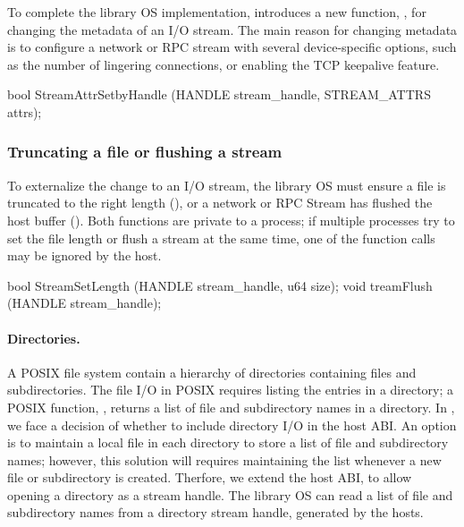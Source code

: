 To complete the library OS implementation, \graphene{} introduces a new function,
,
for changing the metadata of an I/O stream.
The main reason for changing metadata
is to configure a network or RPC stream with several device-specific options,
such as the number of lingering connections,
or enabling the TCP keepalive feature.









\begin{paldef}
bool StreamAttrSetbyHandle (HANDLE stream_handle,
                            STREAM_ATTRS attrs);
\end{paldef}


\subsubsection*{Truncating a file or flushing a stream}




To externalize the change to an I/O stream, the library OS must ensure a file is truncated to the right length (), or a network or RPC Stream has flushed the host buffer ().
Both functions are private to a process; if multiple processes try
to set the file length or flush a stream at the same time, one of the function calls may be ignored by the host.


\begin{paldef}
bool StreamSetLength (HANDLE stream_handle, u64 size);
void treamFlush (HANDLE stream_handle);
\end{paldef}







\paragraph{Directories.}
A POSIX file system contain a hierarchy of directories
containing files and subdirectories.
The file I/O in POSIX requires listing the entries in a directory;
a POSIX function, , returns a list of file and subdirectory names
in a directory.
In \graphene{}, we face a decision of whether to include directory I/O
in the host ABI.
An option is to maintain a local file in each directory
to store a list of file and subdirectory names;
however, this solution will requires maintaining the list whenever a new file or subdirectory is created.
Therfore, we extend the host ABI,
to allow opening a directory as a stream handle.
The library OS can read a list of file and subdirectory names from a directory stream handle,
generated by the hosts.





